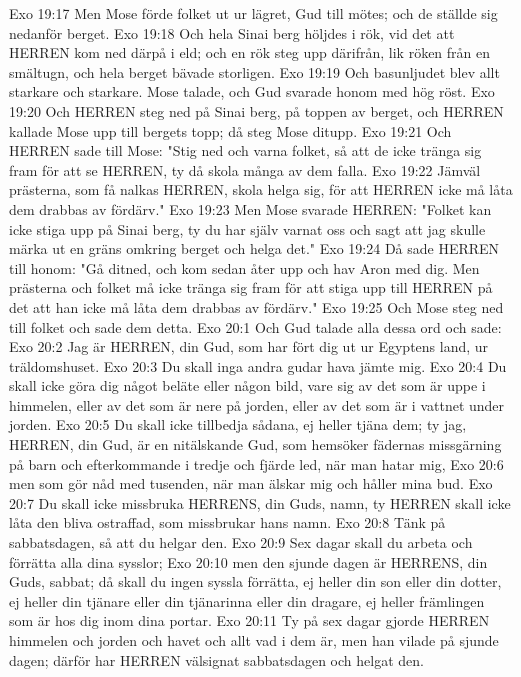 Exo 19:17  Men Mose förde folket ut ur lägret, Gud till mötes; och de ställde sig nedanför berget.
Exo 19:18  Och hela Sinai berg höljdes i rök, vid det att HERREN kom ned därpå i eld; och en rök steg upp därifrån, lik röken från en smältugn, och hela berget bävade storligen.
Exo 19:19  Och basunljudet blev allt starkare och starkare. Mose talade, och Gud svarade honom med hög röst.
Exo 19:20  Och HERREN steg ned på Sinai berg, på toppen av berget, och HERREN kallade Mose upp till bergets topp; då steg Mose ditupp.
Exo 19:21  Och HERREN sade till Mose: "Stig ned och varna folket, så att de icke tränga sig fram för att se HERREN, ty då skola många av dem falla.
Exo 19:22  Jämväl prästerna, som få nalkas HERREN, skola helga sig, för att HERREN icke må låta dem drabbas av fördärv."
Exo 19:23  Men Mose svarade HERREN: "Folket kan icke stiga upp på Sinai berg, ty du har själv varnat oss och sagt att jag skulle märka ut en gräns omkring berget och helga det."
Exo 19:24  Då sade HERREN till honom: "Gå ditned, och kom sedan åter upp och hav Aron med dig. Men prästerna och folket må icke tränga sig fram för att stiga upp till HERREN på det att han icke må låta dem drabbas av fördärv."
Exo 19:25  Och Mose steg ned till folket och sade dem detta.
Exo 20:1  Och Gud talade alla dessa ord och sade:
Exo 20:2  Jag är HERREN, din Gud, som har fört dig ut ur Egyptens land, ur träldomshuset.
Exo 20:3  Du skall inga andra gudar hava jämte mig.
Exo 20:4  Du skall icke göra dig något beläte eller någon bild, vare sig av det som är uppe i himmelen, eller av det som är nere på jorden, eller av det som är i vattnet under jorden.
Exo 20:5  Du skall icke tillbedja sådana, ej heller tjäna dem; ty jag, HERREN, din Gud, är en nitälskande Gud, som hemsöker fädernas missgärning på barn och efterkommande i tredje och fjärde led, när man hatar mig,
Exo 20:6  men som gör nåd med tusenden, när man älskar mig och håller mina bud.
Exo 20:7  Du skall icke missbruka HERRENS, din Guds, namn, ty HERREN skall icke låta den bliva ostraffad, som missbrukar hans namn.
Exo 20:8  Tänk på sabbatsdagen, så att du helgar den.
Exo 20:9  Sex dagar skall du arbeta och förrätta alla dina sysslor;
Exo 20:10  men den sjunde dagen är HERRENS, din Guds, sabbat; då skall du ingen syssla förrätta, ej heller din son eller din dotter, ej heller din tjänare eller din tjänarinna eller din dragare, ej heller främlingen som är hos dig inom dina portar.
Exo 20:11  Ty på sex dagar gjorde HERREN himmelen och jorden och havet och allt vad i dem är, men han vilade på sjunde dagen; därför har HERREN välsignat sabbatsdagen och helgat den.
